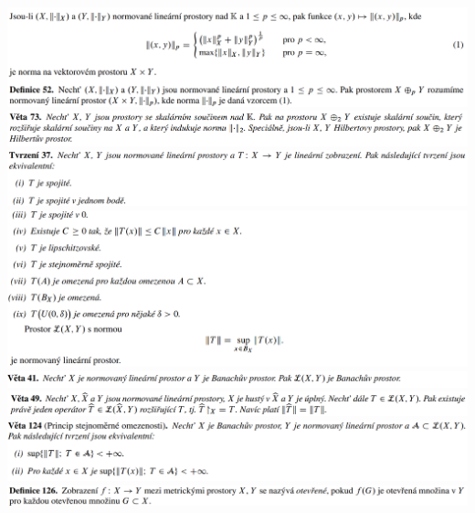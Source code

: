 \documentclass[12pt,a4paper]{article}
\begin{document}
\begin{center}
		\includegraphics[width=\textwidth]{img/2banHilb/2020-06-20 17 19 36.png}\vspace{0.3cm}
		\includegraphics[width=\textwidth]{img/2banHilb/2020-06-20 17 19 12.png}\vspace{0.3cm}
		\includegraphics[width=\textwidth]{img/2banHilb/2020-06-20 17 20 29.png}\vspace{0.3cm}
		\includegraphics[width=\textwidth]{img/2banHilb/2020-06-20 17 20 42.png}\vspace{0.3cm}
		\includegraphics[width=\textwidth]{img/2banHilb/2020-06-20 17 21 19.png}\vspace{0.3cm}
		\includegraphics[width=\textwidth]{img/2banHilb/2020-06-20 17 22 08.png}\vspace{0.3cm}
		\includegraphics[width=\textwidth]{img/2banHilb/2020-06-20 17 29 56.png}\vspace{0.3cm}
		\includegraphics[width=\textwidth]{img/2banHilb/2020-06-20 17 30 11.png}\vspace{0.3cm}

\end{center}
\end{document}
